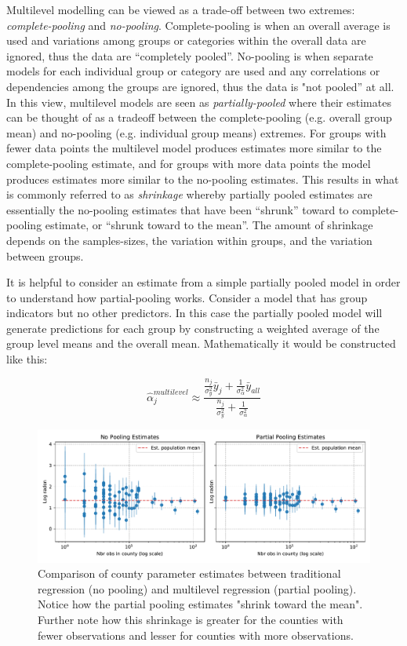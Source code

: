 Multilevel modelling can be viewed as a trade-off between two extremes: \textit{complete-pooling} and \textit{no-pooling}. Complete-pooling is when an overall average is used and variations among groups or categories within the overall data are ignored, thus the data are ``completely pooled”. No-pooling is when separate models for each individual group or category are used and any correlations or dependencies among the groups are ignored, thus the data is "not pooled” at all. In this view, multilevel models are seen as \textit{partially-pooled} where their estimates can be thought of as a tradeoff between the complete-pooling (e.g. overall group mean) and no-pooling (e.g. individual group means) extremes. For groups with fewer data points the multilevel model produces estimates more similar to the complete-pooling estimate, and for groups with more data points the model produces estimates more similar to the no-pooling estimates. This results in what is commonly referred to as \textit{shrinkage} whereby partially pooled estimates are essentially the no-pooling estimates that have been “shrunk” toward to complete-pooling estimate, or “shrunk toward to the mean”. The amount of shrinkage depends on the samples-sizes, the variation within groups, and the variation between groups.

It is helpful to consider an estimate from a simple partially pooled model in order to understand how partial-pooling works. Consider a model that has group indicators but no other predictors. In this case the partially pooled model will generate predictions for each group by constructing a weighted average of the group level means and the overall mean. Mathematically it would be constructed like this:

\begin{equation} \label{eq:mlm_ex}
\hat{\alpha}_j^{multilevel} \approx \frac{ \frac{n_j}{\sigma_y^2} \bar{y}_j + \frac{1}{\sigma_{\alpha}^2} \bar{y}_{all} }{ \frac{n_j}{\sigma_y^2} + \frac{1}{\sigma_{\alpha}^2} }
\end{equation}

\begin{figure}
	\centering
	\includegraphics[width=\textwidth]{figures/radon_example.pdf}
	\caption{Comparison of county parameter estimates between traditional regression (no pooling) and multilevel regression (partial pooling). Notice how the partial pooling estimates "shrink toward the mean". Further note how this shrinkage is greater for the counties with fewer observations and lesser for counties with more observations.}
	\label{fig:radon_example}
\end{figure}

